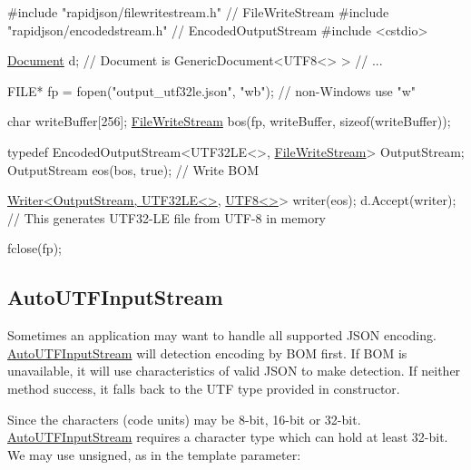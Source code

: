 \begin{DoxyCode}
\textcolor{preprocessor}{#include "rapidjson/filewritestream.h"}  \textcolor{comment}{// FileWriteStream}
\textcolor{preprocessor}{#include "rapidjson/encodedstream.h"}    \textcolor{comment}{// EncodedOutputStream}
\textcolor{preprocessor}{#include <cstdio>}

\hyperlink{class_generic_document}{Document} d;         \textcolor{comment}{// Document is GenericDocument<UTF8<> > }
\textcolor{comment}{// ...}

FILE* fp = fopen(\textcolor{stringliteral}{"output\_utf32le.json"}, \textcolor{stringliteral}{"wb"}); \textcolor{comment}{// non-Windows use "w"}

\textcolor{keywordtype}{char} writeBuffer[256];
\hyperlink{class_file_write_stream}{FileWriteStream} bos(fp, writeBuffer, \textcolor{keyword}{sizeof}(writeBuffer));

\textcolor{keyword}{typedef} EncodedOutputStream<UTF32LE<>, \hyperlink{class_file_write_stream}{FileWriteStream}> OutputStream;
OutputStream eos(bos, \textcolor{keyword}{true});   \textcolor{comment}{// Write BOM}

\hyperlink{class_writer}{Writer<OutputStream, UTF32LE<>}, \hyperlink{struct_u_t_f8}{UTF8<>}> writer(eos);
d.Accept(writer);   \textcolor{comment}{// This generates UTF32-LE file from UTF-8 in memory}

fclose(fp);
\end{DoxyCode}
\hypertarget{md_Cadriciel_Commun_Externe_RapidJSON_doc_stream.zh-cn_AutoUTFInputStream}{}\subsection{Auto\+U\+T\+F\+Input\+Stream}\label{md_Cadriciel_Commun_Externe_RapidJSON_doc_stream.zh-cn_AutoUTFInputStream}
Sometimes an application may want to handle all supported J\+S\+ON encoding. {\ttfamily \hyperlink{class_auto_u_t_f_input_stream}{Auto\+U\+T\+F\+Input\+Stream}} will detection encoding by B\+OM first. If B\+OM is unavailable, it will use characteristics of valid J\+S\+ON to make detection. If neither method success, it falls back to the U\+TF type provided in constructor.

Since the characters (code units) may be 8-\/bit, 16-\/bit or 32-\/bit. {\ttfamily \hyperlink{class_auto_u_t_f_input_stream}{Auto\+U\+T\+F\+Input\+Stream}} requires a character type which can hold at least 32-\/bit. We may use {\ttfamily unsigned}, as in the template parameter\+:


